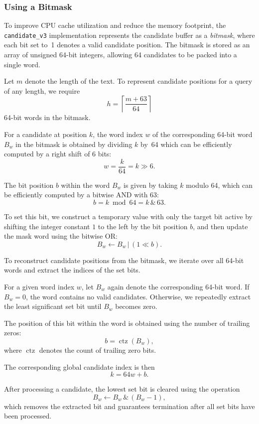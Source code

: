 \documentclass{article}
\begin{document}
    \subsubsection{Using a Bitmask}
    To improve CPU cache utilization and reduce the memory footprint, the \texttt{candidate\_v3} implementation represents the candidate buffer as a \emph{bitmask}, where each bit set to~1 denotes a valid candidate position.
    The bitmask is stored as an array of unsigned 64-bit integers, allowing 64 candidates to be packed into a single word.

    Let $m$ denote the length of the text.
    To represent candidate positions for a query of any length, we require
    \[
        h = \left\lceil \frac{m + 63}{64} \right\rceil
    \]
    64-bit words in the bitmask.

    For a candidate at position $k$, the word index $w$ of the corresponding 64-bit word $B_w$ in the bitmask is obtained by dividing $k$ by~64 which can be efficiently computed by a right shift of 6 bits:
    \[
        w = \frac{k}{64} = k \gg 6.
    \]

    The bit position $b$ within the word $B_w$ is given by taking $k$ modulo 64, which can be efficiently computed by a bitwise AND with 63:
    \[
        b = k \bmod 64 = k \,\&\, 63.
    \]

    To set this bit, we construct a temporary value with only the target bit active by shifting the integer constant $1$ to the left by the bit position $b$, and then update the mask word using the bitwise OR:
    \[
        B_w \gets B_w \,|\, (1 \ll b).
    \]

    To reconstruct candidate positions from the bitmask, we iterate over all 64-bit words and extract the indices of the set bits.

    For a given word index $w$, let $B_w$ again denote the corresponding 64-bit word.
    If $B_w = 0$, the word contains no valid candidates.
    Otherwise, we repeatedly extract the least significant set bit until $B_w$ becomes zero.

    The position of this bit within the word is obtained using the number of trailing zeros:
    \[
        b = \operatorname{ctz}(B_w),
    \]
    where $\operatorname{ctz}$ denotes the count of trailing zero bits.

    The corresponding global candidate index is then
    \[
        k = 64w + b.
    \]

    After processing a candidate, the lowest set bit is cleared using the operation
    \[
        B_w \leftarrow B_w \,\&\, (B_w - 1),
    \]
    which removes the extracted bit and guarantees termination after all set bits have been processed.
\end{document}
